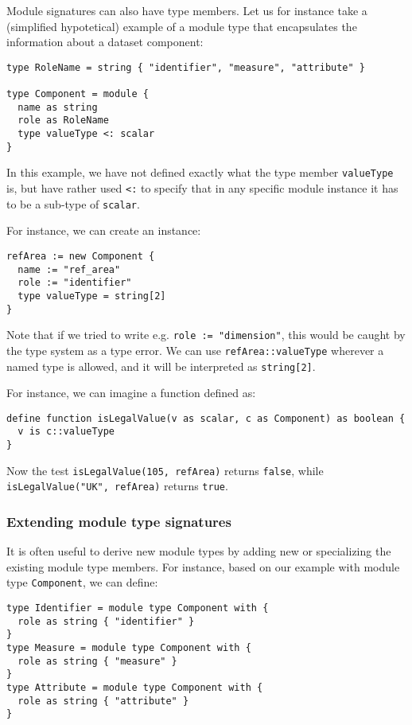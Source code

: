\documentclass[droidmono,libertine,twoside,user,unofficial]{ecarticle}
\begin{document}
Module signatures can also have type members.  Let us for instance
take a (simplified hypotetical) example of a module type that
encapsulates the information about a dataset component:
\begin{lstlisting}
type RoleName = string { "identifier", "measure", "attribute" }

type Component = module {
  name as string
  role as RoleName
  type valueType <: scalar
}
\end{lstlisting}

In this example, we have not defined exactly what the type member
\texttt{valueType} is, but have rather used \texttt{<:} to specify
that in any specific module instance it has to be a sub-type of
\texttt{scalar}.

For instance, we can create an instance:
\begin{lstlisting}
refArea := new Component {
  name := "ref_area"
  role := "identifier"
  type valueType = string[2]
}
\end{lstlisting}

Note that if we tried to write e.g. \texttt{role := "dimension"}, this
would be caught by the type system as a type error.  We can use
\texttt{refArea::valueType} wherever a named type is allowed, and it
will be interpreted as \texttt{string[2]}.

For instance, we can imagine a function defined as:
\begin{lstlisting}
define function isLegalValue(v as scalar, c as Component) as boolean {
  v is c::valueType
}
\end{lstlisting}

Now the test \texttt{isLegalValue(105, refArea)} returns
\texttt{false}, while \texttt{isLegalValue("UK", refArea)} returns
\texttt{true}.

\subsubsection*{Extending module type signatures}

It is often useful to derive new module types by adding new or
specializing the existing module type members.  For instance, based on
our example with module type \texttt{Component}, we can define:
\begin{lstlisting}
type Identifier = module type Component with {
  role as string { "identifier" }
}
type Measure = module type Component with {
  role as string { "measure" }
}
type Attribute = module type Component with {
  role as string { "attribute" }
}
\end{lstlisting}
\end{document}
